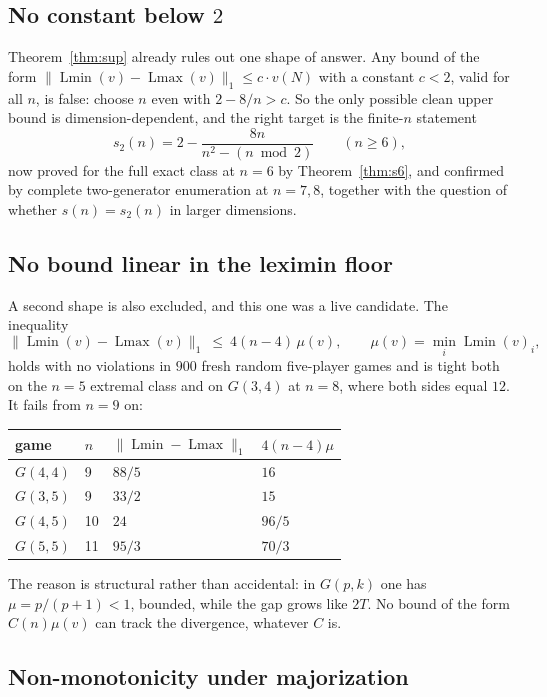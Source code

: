 \documentclass[11pt]{article}
\newcommand{\Lmin}{\operatorname{Lmin}}
\newcommand{\Lmax}{\operatorname{Lmax}}
\begin{document}
\subsection{No constant below \texorpdfstring{$2$}{2}}

Theorem~\ref{thm:sup} already rules out one shape of answer.  Any bound of
the form $\|\Lmin(v)-\Lmax(v)\|_1\le c\cdot v(N)$ with a constant $c<2$,
valid for all $n$, is false: choose $n$ even with $2-8/n>c$.  So the only
possible clean upper bound is dimension-dependent, and the right target is
the finite-$n$ statement
\[
 s_2(n)=2-\frac{8n}{n^2-(n\bmod2)}\qquad(n\ge6),
\]
now proved for the full exact class at $n=6$ by Theorem~\ref{thm:s6}, and
confirmed by complete two-generator enumeration at $n=7,8$, together with the
question of whether $s(n)=s_2(n)$ in larger dimensions.

\subsection{No bound linear in the leximin floor}

A second shape is also excluded, and this one was a live candidate.  The
inequality
\[
 \|\Lmin(v)-\Lmax(v)\|_1\ \le\ 4(n-4)\,\mu(v),\qquad \mu(v)=\min_i\Lmin(v)_i,
\]
holds with no violations in $900$ fresh random five-player games and is tight
both on the $n=5$ extremal class and on $G(3,4)$ at $n=8$, where both sides
equal $12$.  It fails from $n=9$ on:
\begin{center}
\begin{tabular}{@{}llll@{}}
\toprule
game & $n$ & $\|\Lmin-\Lmax\|_1$ & $4(n-4)\mu$\\
\midrule
$G(4,4)$ & 9 & $88/5$ & $16$\\
$G(3,5)$ & 9 & $33/2$ & $15$\\
$G(4,5)$ & 10 & $24$ & $96/5$\\
$G(5,5)$ & 11 & $95/3$ & $70/3$\\
\bottomrule
\end{tabular}
\end{center}
The reason is structural rather than accidental: in $G(p,k)$ one has
$\mu=p/(p+1)<1$, bounded, while the gap grows like $2T$.  No bound of the
form $C(n)\mu(v)$ can track the divergence, whatever $C$ is.

\subsection{Non-monotonicity under majorization}
\end{document}
